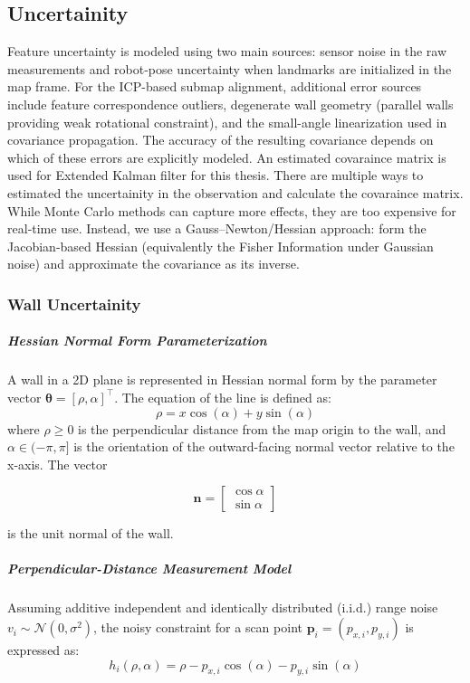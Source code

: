 \documentclass[11pt]{article}
\begin{document}
\subsection{Uncertainity}

Feature uncertainty is modeled using two main sources: sensor noise in the raw measurements and robot‑pose uncertainty when landmarks are initialized in the map frame. For the ICP-based submap alignment, additional error sources include feature correspondence outliers, degenerate wall geometry (parallel walls providing weak rotational constraint), and the small-angle linearization used in covariance propagation. The accuracy of the resulting covariance depends on which of these errors are explicitly modeled. An estimated covaraince matrix is used for Extended Kalman filter for this thesis. There are multiple ways to estimated the uncertainity in the observation and calculate the covaraince matrix. While Monte Carlo methods can capture more effects, they are too expensive for real‑time use. Instead, we use a Gauss–Newton/Hessian approach: form the Jacobian‑based Hessian (equivalently the Fisher Information under Gaussian noise) and approximate the covariance as its inverse.\cite{censi}

\subsubsection{Wall Uncertainity}

\subparagraph{Hessian Normal Form Parameterization}
A wall in a 2D plane is represented in Hessian normal form by the parameter vector $\mathbf{\theta} = [\rho, \alpha]^\top$. The equation of the line is defined as:
\begin{equation}
	\rho = x \cos(\alpha) + y \sin(\alpha)
\end{equation}
where $\rho \geq 0$ is the perpendicular distance from the map origin to the wall, and $\alpha \in (-\pi, \pi]$ is the orientation of the outward-facing normal vector relative to the x-axis. 
The vector

\[
\mathbf{n} =
\begin{bmatrix}
	\cos\alpha \\
	\sin\alpha
\end{bmatrix}
\]

is the unit normal of the wall.

\subparagraph{Perpendicular-Distance Measurement Model}
Assuming additive independent and identically distributed (i.i.d.) range noise $v_i \sim \mathcal{N}(0, \sigma^2)$, the noisy constraint for a scan point $\mathbf{p}_i = (p_{x,i}, p_{y,i})$ is expressed as:
\begin{equation}
	h_i(\rho, \alpha) = \rho - p_{x,i} \cos(\alpha) - p_{y,i} \sin(\alpha)
\end{equation}
\end{document}
